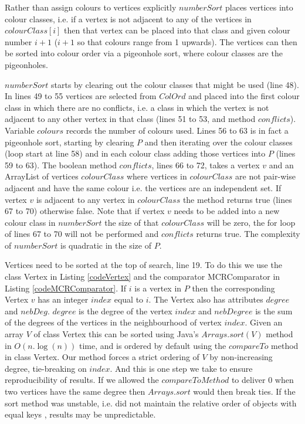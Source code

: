 \documentclass{l4proj}
\begin{document}
Rather than assign colours to vertices explicitly $numberSort$ places vertices into colour classes, i.e.
if a vertex is not adjacent to any of the vertices in $colourClass[i]$ then that vertex can be placed into
that class and given colour number $i+1$ ($i+1$ so that colours range from 1 upwards). The vertices can then be sorted into
colour order via a pigeonhole sort, where colour classes are the pigeonholes.

$numberSort$ starts by clearing out the colour classes that might be used (line 48). In lines 49 to 55 vertices are selected
from $ColOrd$ and placed into the first colour class in which there are no conflicts, i.e. a class in which the vertex is not adjacent to any 
other vertex in that class (lines 51 to 53, and method $conflicts$). Variable $colours$ records the number of colours used. Lines
56 to 63 is in fact a pigeonhole sort, starting by clearing $P$ and then iterating over the 
colour classes (loop start at line 58) and in each colour class adding those vertices into $P$ (lines 59 to 63). The boolean method
$conflicts$, lines 66 to 72, takes a vertex $v$ and an ArrayList of vertices $colourClass$ where vertices in $colourClass$
are not pair-wise adjacent and have the same colour i.e. the vertices are an independent set. If vertex $v$ is adjacent to 
any vertex in $colourClass$ the method returns true (lines 67 to 70) otherwise false. Note that if vertex $v$ 
needs to be added into a new colour class in $numberSort$ the size of that $colourClass$ will be zero, the for loop
of lines 67 to 70 will not be performed and $conflicts$ returns true. The complexity of $numberSort$ is quadratic in the size of $P$.

\begin{figure}

\end{figure}

Vertices need to be sorted at the top of search, line 19. To do this we use the class Vertex in Listing \ref{codeVertex}
and the comparator MCRComparator in Listing \ref{codeMCRComparator}.
If $i$ is a vertex in $P$ then the corresponding Vertex $v$ has an integer $index$ equal to $i$. The Vertex also has attributes
$degree$ and $nebDeg$. $degree$ is the degree of the vertex $index$ and $nebDegree$ is the sum of the degrees of the vertices
in the neighbourhood of vertex $index$. Given an array
$V$ of class Vertex this can be sorted using Java's $Arrays.sort(V)$ method in $O(n.\log(n))$ time, and is ordered 
by default using the
$compareTo$ method in class Vertex. Our method forces a strict ordering of $V$ by non-increasing degree, tie-breaking on $index$. And
this is one step we take to ensure reproducibility of results. If we allowed the $compareToMethod$ to deliver $0$ when
two vertices have the same degree then $Arrays.sort$ would then break ties. If the sort method was unstable, i.e. did
not maintain the relative order of objects with equal keys \cite{qsort}, results may be unpredictable. 
\end{document}
